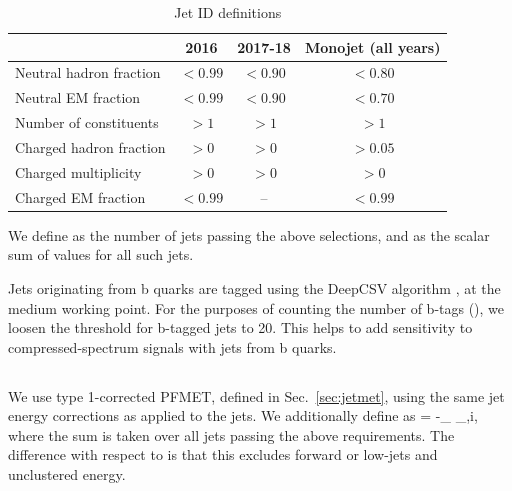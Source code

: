 \begin{table}[h]
\caption{Jet ID definitions}
\label{tab:jet_id}
\centering
\begin{tabular}{l|c|c|c}
\hline
 & 2016 & 2017-18 & Monojet (all years) \\ \hline
Neutral hadron fraction & $<0.99$ & $<0.90$ & $<0.80$ \\
Neutral EM fraction & $<0.99$ & $<0.90$ & $<0.70$ \\
Number of constituents & $>1$ & $>1$ & $>1$ \\
Charged hadron fraction & $>0$ & $>0$ & $>0.05$ \\
Charged multiplicity & $>0$ & $>0$ & $>0$ \\
Charged EM fraction & $<0.99$ & -- & $<0.99$ \\
\hline
\end{tabular}
\end{table}

We define \Nj as the number of jets passing the above selections, and \Ht as 
the scalar sum of \pt values for all such jets.

Jets originating from b quarks are tagged using the DeepCSV algorithm \cite{BTV_btagging}, at the medium working point. 
For the purposes of counting the number of b-tags (\Nb), we loosen the \pt threshold for b-tagged jets to 20\GeV.
This helps to add sensitivity to compressed-spectrum signals with jets from b quarks.

\subsection{\ptmiss}
We use type 1-corrected PFMET, defined in Sec.~\ref{sec:jetmet}, using the same jet energy corrections
as applied to the jets. We additionally define \vMht as
\be
\vMht = -\sum_ _{,i},
\ee
where the sum is taken over all jets passing the above requirements. The difference with respect to \vMet is that
this excludes forward or low-\pt jets and unclustered energy.

